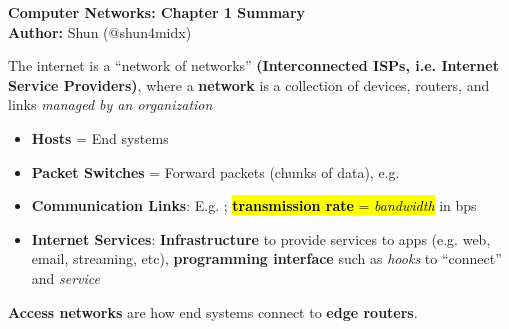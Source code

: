 \documentclass[12pt,a4paper]{article}
\begin{document}
\begin{center}
  {\Large \bf Computer Networks: Chapter 1 Summary}\\[8pt]
  \textbf{Author:} Shun (@shun4midx)
\end{center}

\noindent The internet is a ``network of networks'' \textbf{(Interconnected ISPs, i.e. Internet Service Providers)}, where a \textbf{network} is a collection of devices, routers, and links \emph{managed by an organization}
\vspace{0.5em}\begin{itemize}
    \item \textbf{Hosts} = End systems
    \item \textbf{Packet Switches} = Forward packets (chunks of data), e.g. 
    \item \textbf{Communication Links}: E.g. ; \hl{\textbf{transmission rate} = \emph{bandwidth}} in bps
    \item \textbf{Internet Services}: \textbf{Infrastructure} to provide services to apps (e.g. web, email, streaming, etc), \textbf{programming interface} such as \emph{hooks} to ``connect'' and \emph{service}
\end{itemize}


\vspace{1.0em}
\noindent \textbf{Access networks} are how end systems connect to \textbf{edge routers}. 
\end{document}

